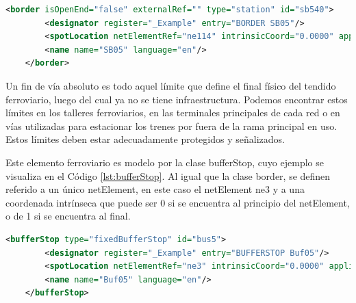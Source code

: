     \begin{lstlisting}[language = XML, caption = Clase border , label = {lst:lineBorder}]
    <border isOpenEnd="false" externalRef="" type="station" id="sb540">
        <designator register="_Example" entry="BORDER SB05"/>
        <spotLocation netElementRef="ne114" intrinsicCoord="0.0000" applicationDirection="reverse" id="sb540_sloc01"/>
        <name name="SB05" language="en"/>
    </border>
    \end{lstlisting}

    Un fin de vía absoluto es todo aquel límite que define el final físico del tendido ferroviario, luego del cual ya no se tiene infraestructura. Podemos encontrar estos límites en los talleres ferroviarios, en las terminales principales de cada red o en vías utilizadas para estacionar los trenes por fuera de la rama principal en uso. Estos límites deben estar adecuadamente protegidos y señalizados.

    Este elemento ferroviario es modelo por la clase bufferStop, cuyo ejemplo se visualiza en el Código \ref{lst:bufferStop}. Al igual que la clase border, se definen referido a un único netElement, en este caso el netElement ne3 y a una coordenada intrínseca que puede ser 0 si se encuentra al principio del netElement, o de 1 si se encuentra al final.
    
    \begin{lstlisting}[language = XML, caption = Clase bufferStop , label = {lst:bufferStop}]
    <bufferStop type="fixedBufferStop" id="bus5">
        <designator register="_Example" entry="BUFFERSTOP Buf05"/>
        <spotLocation netElementRef="ne3" intrinsicCoord="0.0000" applicationDirection="reverse" id="bus5_sloc01"/>
        <name name="Buf05" language="en"/>
    </bufferStop>
    \end{lstlisting}